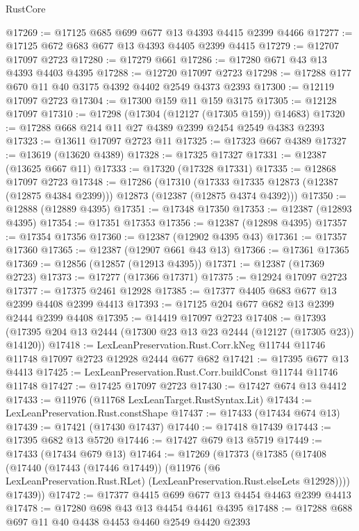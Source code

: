 \begin{lexlean}{RustCore}
\begin{coremodule}
@17269 := @17125 @685 @699 @677 @13 @4393 @4415 @2399 @4466
@17277 := @17125 @672 @683 @677 @13 @4393 @4405 @2399 @4415
@17279 := @12707 @17097 @2723
@17280 := @17279 @661
@17286 := @17280 @671 @43 @13 @4393 @4403 @4395
@17288 := @12720 @17097 @2723
@17298 := @17288 @177 @670 @11 @40 @3175 @4392 @4402 @2549 @4373 @2393
@17300 := @12119 @17097 @2723
@17304 := @17300 @159 @11 @159 @3175
@17305 := @12128 @17097
@17310 := @17298 (@17304 (@12127 (@17305 @159)) @14683)
@17320 := @17288 @668 @214 @11 @27 @4389 @2399 @2454 @2549 @4383 @2393
@17323 := @13611 @17097 @2723 @11
@17325 := @17323 @667 @4389
@17327 := @13619 (@13620 @4389)
@17328 := @17325 @17327
@17331 := @12387 (@13625 @667 @11)
@17333 := @17320 (@17328 @17331)
@17335 := @12868 @17097 @2723
@17348 := @17286
    (@17310
      (@17333 @17335 @12873 (@12387 (@12875 @4384 @2399)))
      @12873
      (@12387 (@12875 @4374 @4392)))
@17350 := @12888 (@12889 @4395)
@17351 := @17348 @17350
@17353 := @12387 (@12893 @4395)
@17354 := @17351 @17353
@17356 := @12387 (@12898 @4395)
@17357 := @17354 @17356
@17360 := @12387 (@12902 @4395 @43)
@17361 := @17357 @17360
@17365 := @12387 (@12907 @661 @43 @13)
@17366 := @17361 @17365
@17369 := @12856 (@12857 (@12913 @4395))
@17371 := @12387 (@17369 @2723)
@17373 := @17277 (@17366 @17371)
@17375 := @12924 @17097 @2723
@17377 := @17375 @2461 @12928
@17385 := @17377 @4405 @683 @677 @13 @2399 @4408 @2399 @4413
@17393 := @17125 @204 @677 @682 @13 @2399 @2444 @2399 @4408
@17395 := @14419 @17097 @2723
@17408 := @17393 (@17395 @204 @13 @2444 (@17300 @23 @13 @23 @2444 (@12127 (@17305 @23)) @14120))
@17418 := LexLeanPreservation.Rust.Corr.kNeg
    @11744
    @11746
    @11748
    @17097
    @2723
    @12928
    @2444
    @677
    @682
@17421 := @17395 @677 @13 @4413
@17425 := LexLeanPreservation.Rust.Corr.buildConst @11744 @11746 @11748
@17427 := @17425 @17097 @2723
@17430 := @17427 @674 @13 @4412
@17433 := @11976 (@11768 LexLeanTarget.RustSyntax.Lit)
@17434 := LexLeanPreservation.Rust.constShape
@17437 := @17433 (@17434 @674 @13)
@17439 := @17421 (@17430 @17437)
@17440 := @17418 @17439
@17443 := @17395 @682 @13 @5720
@17446 := @17427 @679 @13 @5719
@17449 := @17433 (@17434 @679 @13)
@17464 := @17269
    (@17373
      (@17385
        (@17408
          (@17440
            (@17443 (@17446 @17449))
            (@11976 (@6 LexLeanPreservation.Rust.RLet) (LexLeanPreservation.Rust.elseLets @12928))))
        @17439))
@17472 := @17377 @4415 @699 @677 @13 @4454 @4463 @2399 @4413
@17478 := @17280 @698 @43 @13 @4454 @4461 @4395
@17488 := @17288 @688 @697 @11 @40 @4438 @4453 @4460 @2549 @4420 @2393

\end{coremodule}
\end{lexlean}
